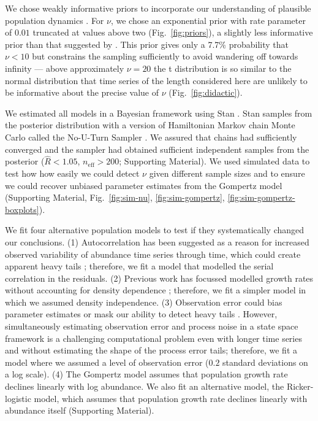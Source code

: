 We chose weakly informative priors to incorporate our understanding of plausible population dynamics \citep[Supporting Material]{gelman2014}. For $\nu$, we chose an exponential prior with rate parameter of $0.01$ truncated at values above two (Fig.~\ref{fig:priors}), a slightly less informative prior than that suggested by \citet{fernandez1998}. This prior gives only a 7.7\% probability that $\nu < 10$ but constrains the sampling sufficiently to avoid wandering off towards infinity --- above approximately $\nu = 20$ the t distribution is so similar to the normal distribution that time series of the length considered here are unlikely to be informative about the precise value of $\nu$ (Fig.~\ref{fig:didactic}).

We estimated all models in a Bayesian framework using Stan \citep{stan-manual2014}. Stan samples from the posterior distribution with a version of Hamiltonian Markov chain Monte Carlo called the No-U-Turn Sampler \citep{hoffman2014}. We assured that chains had sufficiently converged and the sampler had obtained sufficient independent samples from the posterior ($\widehat{R} < 1.05$, $n_\mathrm{eff} > 200$; Supporting Material). We used simulated data to test how how easily we could detect $\nu$ given different sample sizes and to ensure we could recover unbiased parameter estimates from the Gompertz model (Supporting Material, Fig.~\ref{fig:sim-nu}, \ref{fig:sim-gompertz}, \ref{fig:sim-gompertz-boxplots}).

We fit four alternative population models to test if they systematically changed our conclusions. (1) Autocorrelation has been suggested as a reason for increased observed variability of abundance time series through time, which could create apparent heavy tails \citep{inchausti2002}; therefore, we fit a model that modelled the serial correlation in the residuals. (2) Previous work has focussed modelled growth rates without accounting for density dependence \citep{segura2013}; therefore, we fit a simpler model in which we assumed density independence. (3) Observation error could bias parameter estimates \citep{knape2012} or mask our ability to detect heavy tails \citep{ward2007}. However, simultaneously estimating observation error and process noise in a state space framework is a challenging computational problem \citep[e.g.][]{dennis2006, knape2008} even with longer time series and without estimating the shape of the process error tails; therefore, we fit a model where we assumed a level of observation error ($0.2$ standard deviations on a log scale). (4) The Gompertz model assumes that population growth rate declines linearly with log abundance. We also fit an alternative model, the Ricker-logistic model, which assumes that population growth rate declines linearly with abundance itself (Supporting Material).

